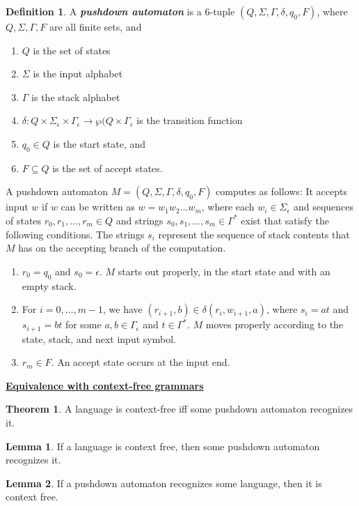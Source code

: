 \documentclass[11pt]{article}
\theoremstyle{definition}
\newtheorem{defn}{Definition}[section]
\newtheorem{thm}{Theorem}[section]
\newtheorem{lemma}{Lemma}[section]
\begin{document}
\begin{defn}
A \textbf{\textit{pushdown automaton}} is a 6-tuple $(Q,\Sigma, \Gamma, \delta, q_0, F)$, where $Q,\Sigma, \Gamma,  F$ are all finite sets, and
\begin{enumerate}
    \item $Q$ is the set of states
    \item $\Sigma$ is the input alphabet
    \item $\Gamma$ is the stack alphabet
    \item $\delta:Q\times\Sigma_\epsilon\times \Gamma_\epsilon\to \wp(Q\times\Gamma_\epsilon$ is the transition function
    \item $q_0\in Q$ is the start state, and 
    \item $F\subseteq Q$ is the set of accept states.
\end{enumerate}
A pushdown automaton $M = (Q,\Sigma, \Gamma, \delta, q_0, F)$ computes as follows: It accepts input $w$ if $w$ can be written as $w=w_1w_2\ldots w_m$, where each $w_i\in \Sigma_\epsilon$ and sequences of states $r_0,r_1,\ldots, r_m\in Q$ and strings $s_0,s_1,\ldots,s_m\in \Gamma^*$ exist that satisfy the following conditions. The strings $s_i$ represent the sequence of stack contents that $M$ has on the accepting branch of the computation.
\begin{enumerate}
    \item $r_0 = q_0$ and $s_0 = \epsilon$. $M$ starts out properly, in the start state and with an empty stack.
    \item For $i=0,\ldots, m-1$, we have $(r_{i+1}, b)\in \delta(r_i, w_{i+1}, a)$, where $s_i = at$ and $s_{i+1} = bt$ for some $a,b\in \Gamma_\epsilon$ and $t\in\Gamma^*$. $M$ moves properly according to the state, stack, and next input symbol.
    \item $r_m\in F$. An accept state occurs at the input end.
\end{enumerate}
\end{defn}
\textbf{\underline{Equivalence with context-free grammars}}
\begin{thm}
    A language is context-free iff some pushdown automaton recognizes it.
\end{thm}
\begin{lemma}
If a language is context free, then some pushdown automaton recognizes it.
\end{lemma}
\begin{lemma}
If a pushdown automaton recognizes some language, then it is context free.
\end{lemma}
\end{document}
